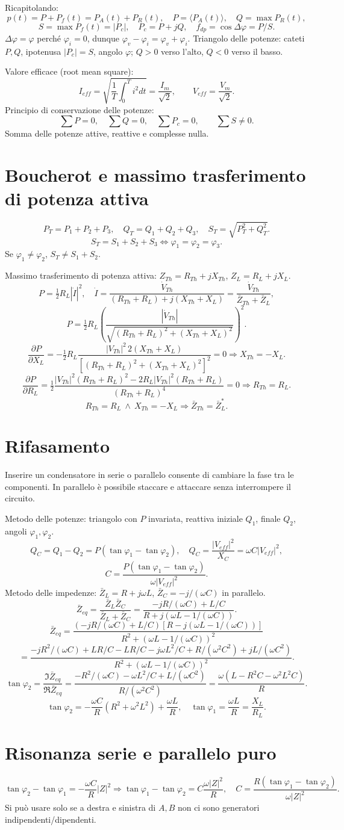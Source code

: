 \documentclass[11pt,a4paper]{article}
\newcommand{\pagina}[2]{\clearpage\section*{#2}}
\begin{document}
Ricapitolando:
\[p(t)=P+P_f(t)=P_A(t)+P_R(t),\quad P=\langle P_A(t)\rangle,\quad Q=\max P_R(t),\]
\[S=\max P_f(t)=|P_c|,\quad P_c=P+jQ,\quad f_{dp}=\cos\Delta\varphi=P/S.\]
$\Delta\varphi=\varphi$ perché $\varphi_i=0$, dunque $\varphi_v-\varphi_i=\varphi_v+\varphi_i$. Triangolo delle potenze: cateti $P,Q$, ipotenusa $|P_c|=S$, angolo $\varphi$; $Q>0$ verso l'alto, $Q<0$ verso il basso.

Valore efficace (root mean square):
\[I_{eff}=\sqrt{\frac1T\int_0^Ti^2dt}=\frac{I_m}{\sqrt2},\qquad V_{eff}=\frac{V_m}{\sqrt2}.\]
Principio di conservazione delle potenze:
\[\sum P=0,\quad\sum Q=0,\quad\sum P_c=0,\qquad\sum S\ne0.\]
Somma delle potenze attive, reattive e complesse nulla.
\pagina{27}{Boucherot e massimo trasferimento di potenza attiva}
\[P_T=P_1+P_2+P_3,\quad Q_T=Q_1+Q_2+Q_3,\quad S_T=\sqrt{P_T^2+Q_T^2}.\]
\[S_T=S_1+S_2+S_3\Leftrightarrow\varphi_1=\varphi_2=\varphi_3.\]
Se $\varphi_1\ne\varphi_2$, $S_T\ne S_1+S_2$.

Massimo trasferimento di potenza attiva: $Z_{Th}=R_{Th}+jX_{Th}$, $Z_L=R_L+jX_L$.
\[P=\tfrac12R_L|\dot I|^2,\quad\dot I=\frac{\dot V_{Th}}{(R_{Th}+R_L)+j(X_{Th}+X_L)}=\frac{\dot V_{Th}}{\bar Z_{Th}+\bar Z_L},\]
\[P=\tfrac12R_L\left(\frac{|\dot V_{Th}|}{\sqrt{(R_{Th}+R_L)^2+(X_{Th}+X_L)^2}}\right)^2.\]
\[\frac{\partial P}{\partial X_L}=-\tfrac12R_L\frac{|V_{Th}|^2\,2(X_{Th}+X_L)}{[(R_{Th}+R_L)^2+(X_{Th}+X_L)^2]^2}=0\Rightarrow X_{Th}=-X_L.\]
\[\frac{\partial P}{\partial R_L}=\tfrac12\frac{|V_{Th}|^2(R_{Th}+R_L)^2-2R_L|V_{Th}|^2(R_{Th}+R_L)}{(R_{Th}+R_L)^4}=0\Rightarrow R_{Th}=R_L.\]
\[R_{Th}=R_L\ \wedge\ X_{Th}=-X_L\Rightarrow\bar Z_{Th}=\bar Z_L^*.\]
\pagina{28}{Rifasamento}
Inserire un condensatore in serie o parallelo consente di cambiare la fase tra le componenti. In parallelo è possibile staccare e attaccare senza interrompere il circuito.

Metodo delle potenze: triangolo con $P$ invariata, reattiva iniziale $Q_1$, finale $Q_2$, angoli $\varphi_1,\varphi_2$.
\[Q_C=Q_1-Q_2=P(\tan\varphi_1-\tan\varphi_2),\quad Q_C=\frac{|V_{eff}|^2}{X_C}=\omega C|V_{eff}|^2,\]
\[C=\frac{P(\tan\varphi_1-\tan\varphi_2)}{\omega|V_{eff}|^2}.\]
Metodo delle impedenze: $\bar Z_L=R+j\omega L$, $\bar Z_C=-j/(\omega C)$ in parallelo.
\[\bar Z_{eq}=\frac{\bar Z_L\bar Z_C}{\bar Z_L+\bar Z_C}=\frac{-jR/(\omega C)+L/C}{R+j(\omega L-1/(\omega C))}.\]
\[\bar Z_{eq}=\frac{(-jR/(\omega C)+L/C)[R-j(\omega L-1/(\omega C))]}{R^2+(\omega L-1/(\omega C))^2}\]
\[=\frac{-jR^2/(\omega C)+LR/C-LR/C-j\omega L^2/C+R/(\omega^2C^2)+jL/(\omega C^2)}{R^2+(\omega L-1/(\omega C))^2}.\]
\[\tan\varphi_2=\frac{\Im\bar Z_{eq}}{\Re\bar Z_{eq}}=\frac{-R^2/(\omega C)-\omega L^2/C+L/(\omega C^2)}{R/(\omega^2C^2)}=\frac{\omega(L-R^2C-\omega^2L^2C)}R.\]
\[\tan\varphi_2=-\frac{\omega C}{R}(R^2+\omega^2L^2)+\frac{\omega L}R,\quad\tan\varphi_1=\frac{\omega L}R=\frac{X_L}{R_L}.\]
\pagina{29}{Risonanza serie e parallelo puro}
\[\tan\varphi_2-\tan\varphi_1=-\frac{\omega C}R|Z|^2\Rightarrow\tan\varphi_1-\tan\varphi_2=C\frac{\omega|Z|^2}R,\quad C=\frac{R(\tan\varphi_1-\tan\varphi_2)}{\omega|Z|^2}.\]
Si può usare solo se a destra e sinistra di $A,B$ non ci sono generatori indipendenti/dipendenti.
\end{document}
